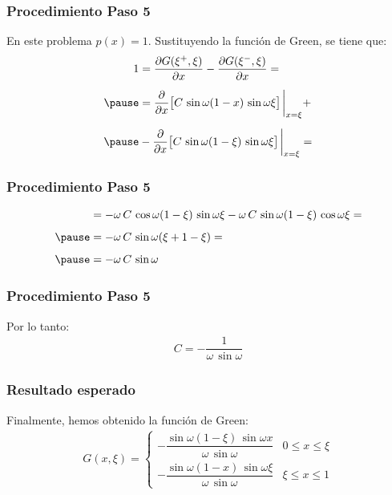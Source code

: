 \documentclass[12pt]{beamer}
\begin{document}
\begin{frame}
\frametitle{Procedimiento Paso 5}
En este problema $p (x) = 1$. Sustituyendo la función de Green, se tiene que:
\pause
\begin{eqnarray*}
\begin{aligned}[b]
1 & = \pdv{G (\xi^{+}, \xi)}{x} - \pdv{G (\xi^{-}, \xi)}{x} = \\[0.5em] \pause
&= \pdv{x} \big[ C \, \sin \omega (1 - x) \, \sin \omega \xi \big] \eval_{x = \xi} + \\[0.5em] \pause
&- \pdv{x} \big[ C \, \sin \omega (1 - \xi) \, \sin \omega \xi \big] \eval_{x = \xi} = 
\end{aligned}
\end{eqnarray*}
\end{frame}

\begin{frame}
\frametitle{Procedimiento Paso 5}
\begin{eqnarray}
\begin{aligned}[b]
&= - \omega \, C \, \cos \omega (1 - \xi) \, \sin \omega \xi - \omega \, C \, \sin \omega (1 - \xi) \, \cos \omega  \xi = \\[0.5em] \pause
&= - \omega \, C \, \sin \omega (\xi + 1 - \xi) = \\[0.5em] \pause
&= - \omega \, C \, \sin \omega
\end{aligned}
\label{eq:ecuacion_07_39}
\end{eqnarray}
\end{frame}

\begin{frame}
\frametitle{Procedimiento Paso 5}
Por lo tanto:
\pause
\begin{align*}
C = - \dfrac{1}{\omega \, \sin \omega}
\end{align*}
\end{frame}

\begin{frame}
\frametitle{Resultado esperado}
Finalmente, hemos obtenido la función de Green:
\pause
\begin{align}
G (x, \xi) = \begin{cases}
- \dfrac{\sin \omega (1 - \xi) \, \sin \omega x}{\omega \, \sin \omega} & 0 \leq x \leq \xi \\[1em]
- \dfrac{\sin \omega (1 - x) \, \sin \omega \xi}{\omega \, \sin \omega} & \xi \leq x \leq 1
\end{cases}
\label{eq:ecuacion_07_40}
\end{align}
\end{frame}
\end{document}
